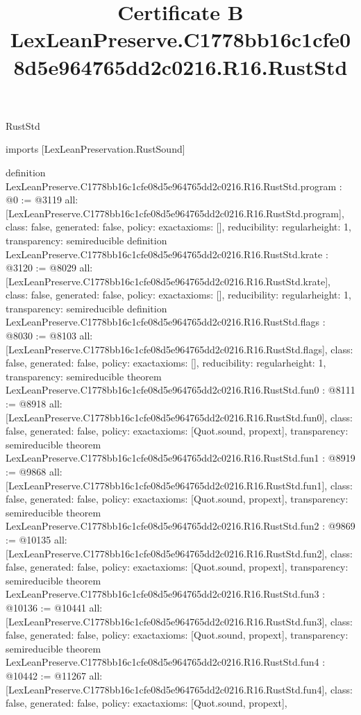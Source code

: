 \begin{lexlean}{RustStd}
\title{Certificate B LexLeanPreserve.C1778bb16c1cfe08d5e964765dd2c0216.R16.RustStd}
\begin{coremodule}
imports [LexLeanPreservation.RustSound]

definition LexLeanPreserve.C1778bb16c1cfe08d5e964765dd2c0216.R16.RustStd.program : @0 := @3119 {
  all: [LexLeanPreserve.C1778bb16c1cfe08d5e964765dd2c0216.R16.RustStd.program],
  class: false,
  generated: false,
  policy: exact{axioms: []},
  reducibility: regular{height: 1},
  transparency: semireducible
}
definition LexLeanPreserve.C1778bb16c1cfe08d5e964765dd2c0216.R16.RustStd.krate : @3120 := @8029 {
  all: [LexLeanPreserve.C1778bb16c1cfe08d5e964765dd2c0216.R16.RustStd.krate],
  class: false,
  generated: false,
  policy: exact{axioms: []},
  reducibility: regular{height: 1},
  transparency: semireducible
}
definition LexLeanPreserve.C1778bb16c1cfe08d5e964765dd2c0216.R16.RustStd.flags : @8030 := @8103 {
  all: [LexLeanPreserve.C1778bb16c1cfe08d5e964765dd2c0216.R16.RustStd.flags],
  class: false,
  generated: false,
  policy: exact{axioms: []},
  reducibility: regular{height: 1},
  transparency: semireducible
}
theorem LexLeanPreserve.C1778bb16c1cfe08d5e964765dd2c0216.R16.RustStd.fun0 : @8111 := @8918 {
  all: [LexLeanPreserve.C1778bb16c1cfe08d5e964765dd2c0216.R16.RustStd.fun0],
  class: false,
  generated: false,
  policy: exact{axioms: [Quot.sound, propext]},
  transparency: semireducible
}
theorem LexLeanPreserve.C1778bb16c1cfe08d5e964765dd2c0216.R16.RustStd.fun1 : @8919 := @9868 {
  all: [LexLeanPreserve.C1778bb16c1cfe08d5e964765dd2c0216.R16.RustStd.fun1],
  class: false,
  generated: false,
  policy: exact{axioms: [Quot.sound, propext]},
  transparency: semireducible
}
theorem LexLeanPreserve.C1778bb16c1cfe08d5e964765dd2c0216.R16.RustStd.fun2 : @9869 := @10135 {
  all: [LexLeanPreserve.C1778bb16c1cfe08d5e964765dd2c0216.R16.RustStd.fun2],
  class: false,
  generated: false,
  policy: exact{axioms: [Quot.sound, propext]},
  transparency: semireducible
}
theorem LexLeanPreserve.C1778bb16c1cfe08d5e964765dd2c0216.R16.RustStd.fun3 : @10136 := @10441 {
  all: [LexLeanPreserve.C1778bb16c1cfe08d5e964765dd2c0216.R16.RustStd.fun3],
  class: false,
  generated: false,
  policy: exact{axioms: [Quot.sound, propext]},
  transparency: semireducible
}
theorem LexLeanPreserve.C1778bb16c1cfe08d5e964765dd2c0216.R16.RustStd.fun4 : @10442 := @11267 {
  all: [LexLeanPreserve.C1778bb16c1cfe08d5e964765dd2c0216.R16.RustStd.fun4],
  class: false,
  generated: false,
  policy: exact{axioms: [Quot.sound, propext]},
}
\end{coremodule}
\end{lexlean}

